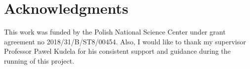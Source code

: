 \documentclass[b5paper, 11pt, openany, titlepage]{book}
\begin{document}
\section*{Acknowledgments}
This work was funded by the Polish National Science Center under grant agreement no 2018/31/B/ST8/00454.
Also, I would like to thank my supervisor Professor Pawel Kudela for his consistent support and guidance during the running of this project.
 
 
\end{document}
